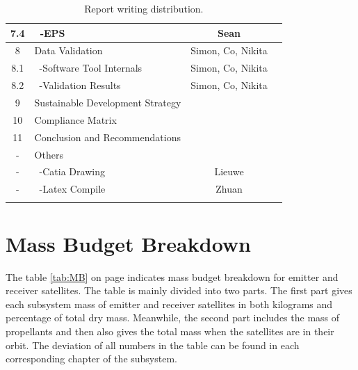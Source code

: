\begin{center}
\begin{longtable}{|c|l|c|c|}
 7.4     & \ -EPS                               & Sean &\\\hline
 8       & Data Validation                      & Simon, Co, Nikita &\\\hline
 8.1     & \ -Software Tool Internals           & Simon, Co, Nikita &\\\hline
 8.2     & \ -Validation Results                & Simon, Co, Nikita &\\\hline
 9       & Sustainable Development Strategy     &&\\\hline
 10      & Compliance Matrix                    &&\\\hline\hline
 11      & Conclusion and Recommendations         &&\\\hline\hline
 -       & Others                               &&\\\hline
 -       & \ -Catia Drawing                     & Lieuwe &\\\hline
 -       & \ -Latex Compile                     & Zhuan &\\\hline

\caption{Report writing distribution.}
\label{tab:RWD}
\end{longtable}
\end{center}

\section{Mass Budget Breakdown}
\label{DDMBB}
The table \ref{tab:MB} on page \pageref{tab:MB} indicates mass budget breakdown for emitter and receiver satellites. The table is mainly divided into two parts. The first part gives each subsystem mass of emitter and receiver satellites in both kilograms and percentage of total dry mass. Meanwhile, the second part includes the mass of propellants and then also gives the total mass when the satellites are in their orbit. The deviation of all numbers in the table can be found in each corresponding chapter of the subsystem.

